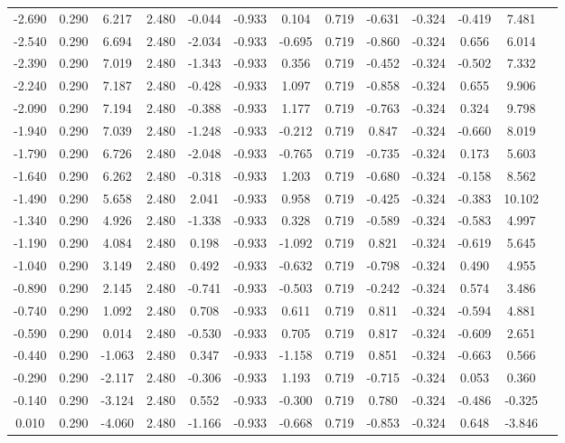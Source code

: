 {\begin{table}[H]
{\begin{tabular}{|c|cccccccccc|c|c|}
-2.690 & 0.290 & 6.217 & 2.480 & -0.044 & -0.933 & 0.104 & 0.719 & -0.631 & -0.324 & -0.419 & 7.481 \\
-2.540 & 0.290 & 6.694 & 2.480 & -2.034 & -0.933 & -0.695 & 0.719 & -0.860 & -0.324 & 0.656 & 6.014 \\
-2.390 & 0.290 & 7.019 & 2.480 & -1.343 & -0.933 & 0.356 & 0.719 & -0.452 & -0.324 & -0.502 & 7.332 \\
-2.240 & 0.290 & 7.187 & 2.480 & -0.428 & -0.933 & 1.097 & 0.719 & -0.858 & -0.324 & 0.655 & 9.906 \\
-2.090 & 0.290 & 7.194 & 2.480 & -0.388 & -0.933 & 1.177 & 0.719 & -0.763 & -0.324 & 0.324 & 9.798 \\
-1.940 & 0.290 & 7.039 & 2.480 & -1.248 & -0.933 & -0.212 & 0.719 & 0.847 & -0.324 & -0.660 & 8.019 \\
-1.790 & 0.290 & 6.726 & 2.480 & -2.048 & -0.933 & -0.765 & 0.719 & -0.735 & -0.324 & 0.173 & 5.603 \\
-1.640 & 0.290 & 6.262 & 2.480 & -0.318 & -0.933 & 1.203 & 0.719 & -0.680 & -0.324 & -0.158 & 8.562 \\
-1.490 & 0.290 & 5.658 & 2.480 & 2.041 & -0.933 & 0.958 & 0.719 & -0.425 & -0.324 & -0.383 & 10.102 \\
-1.340 & 0.290 & 4.926 & 2.480 & -1.338 & -0.933 & 0.328 & 0.719 & -0.589 & -0.324 & -0.583 & 4.997 \\
-1.190 & 0.290 & 4.084 & 2.480 & 0.198 & -0.933 & -1.092 & 0.719 & 0.821 & -0.324 & -0.619 & 5.645 \\
-1.040 & 0.290 & 3.149 & 2.480 & 0.492 & -0.933 & -0.632 & 0.719 & -0.798 & -0.324 & 0.490 & 4.955 \\
-0.890 & 0.290 & 2.145 & 2.480 & -0.741 & -0.933 & -0.503 & 0.719 & -0.242 & -0.324 & 0.574 & 3.486 \\
-0.740 & 0.290 & 1.092 & 2.480 & 0.708 & -0.933 & 0.611 & 0.719 & 0.811 & -0.324 & -0.594 & 4.881 \\
-0.590 & 0.290 & 0.014 & 2.480 & -0.530 & -0.933 & 0.705 & 0.719 & 0.817 & -0.324 & -0.609 & 2.651 \\
-0.440 & 0.290 & -1.063 & 2.480 & 0.347 & -0.933 & -1.158 & 0.719 & 0.851 & -0.324 & -0.663 & 0.566 \\
-0.290 & 0.290 & -2.117 & 2.480 & -0.306 & -0.933 & 1.193 & 0.719 & -0.715 & -0.324 & 0.053 & 0.360 \\
-0.140 & 0.290 & -3.124 & 2.480 & 0.552 & -0.933 & -0.300 & 0.719 & 0.780 & -0.324 & -0.486 & -0.325 \\
0.010 & 0.290 & -4.060 & 2.480 & -1.166 & -0.933 & -0.668 & 0.719 & -0.853 & -0.324 & 0.648 & -3.846 \\

\end{tabular}}
\end{table}}
